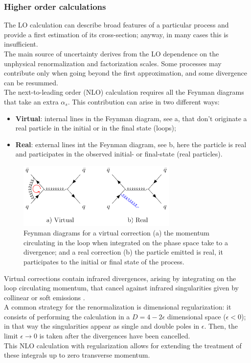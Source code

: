 \subsubsection{Higher order calculations}

The LO calculation can describe broad features of a particular process and provide a first estimation of its cross-section; anyway, in many cases this is insufficient.
\\
The main source of uncertainty derives from the LO dependence  on the unphysical renormalization and factorization scales. Some processes may contribute only when going beyond the first approximation, and some divergence can be resummed. 
\\
The next-to-leading order (NLO) calculation requires all the Feynman diagrams that take an extra $\alpha_s$. This contribution can arise in two different ways:
\begin{itemize}
	\item \textbf{Virtual}: internal lines in the Feynman diagram, see a, that don't originate a real particle in the initial or in the final state (loops);
	\item \textbf{Real}: external lines int the Feynman diagram, see b, here the particle is real and participates in the observed initial- or final-state (real particles).
\end{itemize}
\begin{figure}[!htb]
	\centering
	\includegraphics[width=0.7\textwidth]{img/feynman_Real_Virtual.pdf}
	\caption{Feynman diagrams for a virtual correction (a) the momentum circulating in the loop when integrated on the phase space take to a divergence; and a real correction (b) the particle emitted is real, it participates to the initial or final state of the process.}
	\label{fig:feynman_Real_Virtual}
\end{figure}

Virtual corrections contain infrared divergences, arising by integrating on the loop circulating momentum, that cancel against infrared singularities given by collinear  or soft emissions \cite{PhysRevBloch, KinoshitaToichiro, PhysRevLee}. 
\\
A common strategy for the renormalization is dimensional regularization: it consists of  performing the calculation in a $D=4-2\epsilon$ dimensional space ($\epsilon<0$); in that way the singularities appear as single and double poles in $\epsilon$. Then, the limit $\epsilon\rightarrow0$ is taken after the divergences have been cancelled.
\\
This NLO calculation with regularization allows  for extending the treatment of these integrals up to zero transverse momentum.

